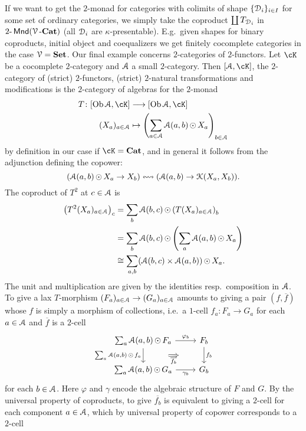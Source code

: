 \documentclass[a4paper,11pt,oneside,openany]{scrbook}
\begin{document}
\begin{rmk}
If we want to get the $2$-monad for categories with colimits of shape $\{\operatorname{\mathcal{D}}_i\}_{i\in I}$ for some set of ordinary categories, we simply take the coproduct $\coprod T_{\operatorname{\mathcal{D}}_i}$ in $2\mbox{-}\operatorname{\mathsf{Mnd}}(\operatorname{\mathcal{V}}\mbox{-}{\normalfont\textbf{Cat}})$ (all $\operatorname{\mathcal{D}}_i$ are $\kappa$-presentable). E.g.\ given shapes for binary coproducts, initial object and coequalizers we get finitely cocomplete categories in the case $\operatorname{\mathcal{V}}={\normalfont\textbf{Set}}$. Our final example concerns $2$-categories of $2$-functors. Let $\cK$ be a cocomplete $2$-category and $\operatorname{\mathcal{A}}$ a small $2$-category. Then $[\A,\cK]$, the $2$-category of (strict) $2$-functors, (strict) $2$-natural transformations and modifications is the $2$-category of algebras for the $2$-monad 
\begin{align*}
    T\colon[\Ob\A,\cK]&\longrightarrow[\Ob\A,\cK]\\
    (X_a)_{a\in\A}&\mapsto \left(\sum_{a\in\A}\A(a,b)\copw X_a\right)_{b\in\A}
\end{align*}
by definition in our case if $\cK=\Cat$, and in general it follows from the adjunction defining the copower:
$$(\operatorname{\mathcal{A}}(a,b)\operatorname{\odot} X_a \to X_b) \leftrightsquigarrow (\operatorname{\mathcal{A}}(a,b)\to\operatorname{\mathcal{K}}(X_a,X_b)).$$
The coproduct of $T^2$ at $c\in\operatorname{\mathcal{A}}$ is 
\begin{align*}
    \left(T^2(X_a)_{a\in\operatorname{\mathcal{A}}}\right)_c &= \sum_b \operatorname{\mathcal{A}}(b,c)\operatorname{\odot}\left(T(X_a)_{a\in\operatorname{\mathcal{A}}}\right)_b \\
    &= \sum_b \operatorname{\mathcal{A}}(b,c)\operatorname{\odot}\left(\sum_a \operatorname{\mathcal{A}}(a,b)\operatorname{\odot} X_a\right)\\
    &\cong \sum_{a,b} (\operatorname{\mathcal{A}}(b,c)\times\operatorname{\mathcal{A}}(a,b))\operatorname{\odot} X_a.
\end{align*}
The unit and multiplication are given by the identities resp.\ composition in $\operatorname{\mathcal{A}}$. To give a lax $T$-morphism $(F_a)_{a\in\operatorname{\mathcal{A}}}\to(G_a)_{a\in\operatorname{\mathcal{A}}}$ amounts to giving a pair $(f,\overline{f})$ whose $f$ is simply a morphism of collections, i.e.\ a $1$-cell $f_a\colon F_a\to G_a$ for each $a\in\operatorname{\mathcal{A}}$ and $\overline{f}$ is a $2$-cell
\[\begin{tikzcd}
	{\sum_a\A(a,b)\copw F_a} & {F_b} \\
	{\sum_a\A(a,b)\copw G_a} & {G_b}
	\arrow["{\varphi_b}", from=1-1, to=1-2]
	\arrow[""{name=0, anchor=center, inner sep=0}, "{f_b}", from=1-2, to=2-2]
	\arrow["{\gamma_b}"', from=2-1, to=2-2]
	\arrow[""{name=1, anchor=center, inner sep=0}, "{\sum_a\A(a,b)\copw f_a}"', from=1-1, to=2-1]
	\arrow["{\overline{f_b}}"', shorten <=30pt, shorten >=30pt, Rightarrow, from=1, to=0]
\end{tikzcd}\]
for each $b\in\operatorname{\mathcal{A}}$. Here $\varphi$ and $\gamma$ encode the algebraic structure of $F$ and $G$. By the universal property of coproducts, to give $\overline{f_b}$ is equivalent to giving a $2$-cell for each component $a\in\operatorname{\mathcal{A}}$, which by universal property of copower corresponds to a $2$-cell 

\end{rmk}
\end{document}
